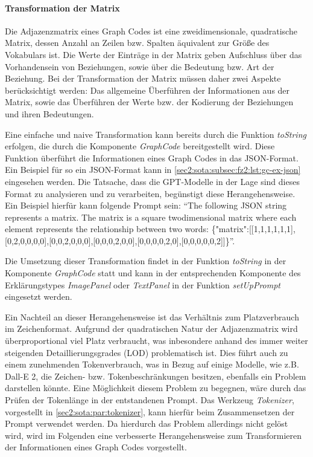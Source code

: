 


\paragraph{Transformation der Matrix}
Die Adjazenzmatrix eines Graph Codes ist eine zweidimensionale, quadratische Matrix, dessen Anzahl an Zeilen bzw. Spalten äquivalent zur Größe des Vokabulars ist.
Die Werte der Einträge in der Matrix geben Aufschluss über das Vorhandensein von Beziehungen, sowie über die Bedeutung bzw. Art der Beziehung.
Bei der Transformation der Matrix müssen daher zwei Aspekte berücksichtigt werden: Das allgemeine Überführen der Informationen aus der Matrix, sowie das Überführen der Werte bzw. der Kodierung der Beziehungen und ihren Bedeutungen.

Eine einfache und naive Transformation kann bereits durch die Funktion \textit{toString} erfolgen, die durch die Komponente \textit{GraphCode} bereitgestellt wird.
Diese Funktion überführt die Informationen eines Graph Codes in das JSON-Format.
Ein Beispiel für so ein JSON-Format kann in \cref{sec2:sota:subsec:fz2:lst:gc-ex-json} eingesehen werden.
Die Tatsache, dass die GPT-Modelle in der Lage sind dieses Format zu analysieren und zu verarbeiten, begünstigt diese Herangehensweise.
Ein Beispiel hierfür kann folgende Prompt sein: \enquote{The following JSON string represents a matrix. The matrix is a square twodimensional matrix where each element represents the relationship between two words: \{"matrix":[[1,1,1,1,1,1],[0,2,0,0,0,0],[0,0,2,0,0,0],[0,0,0,2,0,0],[0,0,0,0,2,0],[0,0,0,0,0,2]]\}}.

Die Umsetzung dieser Transformation findet in der Funktion \textit{toString} in der Komponente \textit{GraphCode} statt und kann in der entsprechenden Komponente des Erklärungstypes \textit{ImagePanel} oder \textit{TextPanel} in der Funktion \textit{setUpPrompt} eingesetzt werden.

Ein Nachteil an dieser Herangehensweise ist das Verhältnis zum Platzverbrauch im Zeichenformat.
Aufgrund der quadratischen Natur der Adjazenzmatrix wird überproportional viel Platz verbraucht, was inbesondere anhand des immer weiter steigenden Detaillierungsgrades (LOD) problematisch ist.
Dies führt auch zu einem zunehmenden Tokenverbrauch, was in Bezug auf einige Modelle, wie z.B. Dall-E 2, die Zeichen- bzw. Tokenbeschränkungen besitzen, ebenfalls ein Problem darstellen könnte.
Eine Möglichkeit diesem Problem zu begegnen, wäre durch das Prüfen der Tokenlänge in der entstandenen Prompt.
Das Werkzeug \textit{Tokenizer}, vorgestellt in \cref{sec2:sota:par:tokenizer}, kann hierfür beim Zusammensetzen der Prompt verwendet werden.
Da hierdurch das Problem allerdings nicht gelöst wird, wird im Folgenden eine verbesserte Herangehensweise zum Transformieren der Informationen eines Graph Codes vorgestellt.


